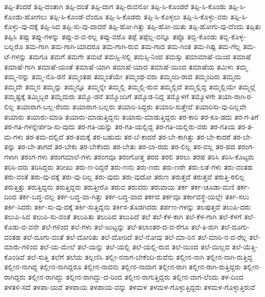 {ತಪ್ಪಿ-ತೆಂದರೆ
ತಪ್ಪಿ-ದಂತಾಗಿ
ತಪ್ಪಿ-ದಂತೆ
ತಪ್ಪಿ-ದಾಗ
ತಪ್ಪಿ-ರುವನೋ
ತಪ್ಪಿ-ಸಿ-ಕೊಂಡರೆ
ತಪ್ಪಿ-ಸಿ-ಕೊಂಡು
ತಪ್ಪಿ-ಸಿ-ಕೊಂಡು-ಹೋಗಲು
ತಪ್ಪಿ-ಸಿ-ಕೊಂಡೆ-ವೆಂದೂ
ತಪ್ಪಿ-ಸಿ-ಕೊಡರು
ತಪ್ಪಿ-ಸಿ-ಕೊಳ್ಳಲು
ತಪ್ಪಿ-ಸಿ-ಕೊಳ್ಳು-ವರು
ತಪ್ಪಿ-ಸಿ-ಕೊಳ್ಳು-ವು-ದಕ್ಕೆ
ತಪ್ಪಿ-ಸಿದ
ತಪ್ಪಿ-ಸು-ವು-ದಾದರೆ
ತಪ್ಪಿ-ಹೋ-ಗಿತ್ತು
ತಪ್ಪಿ-ಹೋ-ಯಿತು
ತಪ್ಪಿ-ಹೋಗು-ವು-ದೆಂದು
ತಪ್ಪಿತು
ತಪ್ಪಿಸಿ
ತಪ್ಪು
ತಪ್ಪು-ಗಳನ್ನು
ತಪ್ಪು-ವ-ವ-ರಲ್ಲ
ತಪ್ಪು-ವರೊ
ತಪ್ಪೆ
ತಪ್ಪೆಲ್ಲ-ವನ್ನೂ
ತಪ್ಪೊ
ತಬ್ಬಿ-ಕೊಂಡು
ತಬ್ಬಿ-ಕೊಳ್ಳ-ಬಲ್ಲರೊ
ತಮ-ಗಾಗಿ
ತಮ-ಗಾಗಿ-ಯಾದರೂ
ತಮ-ಗಾಗಿ-ರುವ
ತಮ-ಗಾದ
ತಮ-ಗಿಂತ
ತಮ-ಗಿಷ್ಟ
ತಮ-ಗೆಲ್ಲ
ತಮ-ಟೆ-ಗಳನ್ನು
ತಮಗೂ
ತಮಗೆ
ತಮಗೇ
ತಮಟೆ
ತಮಸ್ಸಿ-ನಲ್ಲಿ
ತಮಸ್ಸಿ-ನಿಂದ
ತಮಸ್ಸು
ತಮಾಮಾಷೆ-ಯಿಂದ
ತಮಾಷೆ
ತಮಾಷೆ-ಗಾಗಿ
ತಮಾಷೆ-ಯಂತೆ
ತಮಾಷೆ-ಯಾಗಿ
ತಮಾಷೆ-ಯಾದ
ತಮಾಷೆ-ಯಿಂದ
ತಮಾಷೆಯ
ತಮಿಳು
ತಮ್ಮ
ತಮ್ಮ-ನನ್ನು
ತಮ್ಮ-ನೊ-ಡನೆ
ತಮ್ಮಂತಹ
ತಮ್ಮಂತೆಯೇ
ತಮ್ಮಂಥ-ವರು
ತಮ್ಮಂದಿ-ರಾದ
ತಮ್ಮಂದಿರು
ತಮ್ಮದು
ತಮ್ಮದೇ
ತಮ್ಮನ
ತಮ್ಮನ್ನು
ತಮ್ಮನ್ನೂ
ತಮ್ಮನ್ನೇ
ತಮ್ಮಲ್ಲಿ
ತಮ್ಮಲ್ಲಿ-ರುವ
ತಮ್ಮಲ್ಲಿದೆ
ತಮ್ಮಲ್ಲಿದ್ದ
ತಮ್ಮಲ್ಲಿಯೇ
ತಮ್ಮಲ್ಲೆ
ತಮ್ಮಷ್ಟಕ್ಕೆ
ತಮ್ಮಿಬ್ಬರ
ತಮ್ಮೆದುರು
ತಮ್ಮೊ-ಡನೆ
ತಮ್ಮೊಂದಿಗೆ
ತಮ್ಮೊಡ-ನಿದ್ದ
ತಮ್ಮೊಳಗೆ
ತಮ್ಮೊಳಗೇ
ತಯಾ-ರಾಗಿ-ರ-ಲಿಲ್ಲ
ತಯಾರಾಗ-ಬಲ್ಲ-ರೆಂದು
ತಯಾರಾಗ-ಬಲ್ಲರು
ತಯಾರಿ-ಸಿದ್ದರು
ತಯಾರಿ-ಸುತ್ತೇವೆ
ತಯಾರಿಸು-ವು-ದಿಲ್ಲವೇ
ತಯಾರು
ತಯಾರು-ಮಾಡಿ
ತಯಾರು-ಮಾಡುತ್ತಿದ್ದನು
ತಯಾರು-ಮಾಡುತ್ತಿದ್ದರು
ತರ-ಕಾರಿ
ತರ-ಕೂ-ಡದು
ತರ-ಗ-ತಿಗೆ
ತರ-ಗತಿ-ಗಳನ್ನೇರ್ಪಡಿ-ಸು-ವುದು
ತರ-ಗತಿ-ಯನ್ನು
ತರ-ಗತಿ-ಯಲ್ಲಿದ್ದ
ತರ-ಗತಿ-ಯಲ್ಲಿರು-ವರು
ತರ-ಗತಿಯ
ತರ-ತ-ಮ-ಗಳು
ತರ-ತಮ-ದಲ್ಲಿದೆ
ತರ-ತಮಕ್ಕೆ
ತರ-ಬಹುದು
ತರ-ಬೆ-ಕಾದರೆ
ತರ-ಬೇ-ಕಾಗಿತ್ತು
ತರ-ಬೇ-ಕಾದರೆ
ತರ-ಬೇ-ತನ್ನು
ತರ-ಬೇ-ತಾಗದೆ
ತರ-ಬೇಕು
ತರ-ಬೇಕೆಂದು
ತರ-ಬೇತು
ತರ-ಲಾ-ರದು
ತರ-ಲಿಲ್ಲ
ತರ-ವಲ್ಲ
ತರ-ಹದ
ತರಂಗ-ಗಳಾಗಿ
ತರಂಗ-ಗಳು
ತರಂಗಮಾಲೆ-ಗಳು
ತರಂಗವೂ
ತರಂಗೋತ್ತ
ತರದ
ತರಲಿ
ತರಲು
ತರಹ
ತರಿಸಿ
ತರಿಸಿ-ಕೊಟ್ಟರು
ತರಿಸಿ-ದರು
ತರಿಸಿದ್ದರು
ತರೀಖು
ತರು-ಣ-ರಿದ್ದರೆ
ತರು-ಣನು
ತರು-ಣರು
ತರು-ಣರೇ
ತರು-ಲತೆ-ಗಳು
ತರು-ವಂತಹ
ತರು-ವಂತೆ
ತರು-ವು-ದಕ್ಕೆ
ತರು-ವು-ದಿಲ್ಲ
ತರು-ವುದು
ತರು-ವುದೋ
ತರುಣ
ತರುತ್ತದೆ
ತರುತ್ತವೆ
ತರುತ್ತಿ-ರಲಿಲ್ಲ
ತರುತ್ತಿತ್ತು
ತರುತ್ತಿದ್ದನು
ತರುತ್ತಿದ್ದರು
ತರುತ್ತೀರೊ
ತರುವ
ತರುವರು
ತರುವಾಯ
ತರ್ಕ
ತರ್ಕ-ಚೂಡಾ-ಮಣಿ
ತರ್ಕ-ದಿಂದ
ತರ್ಕ-ಬದ್ಧ-ವಲ್ಲ
ತರ್ಕ-ಬದ್ಧ-ವಾ-ಗಿತ್ತು
ತರ್ಕ-ಬದ್ಧ-ವಾದ
ತರ್ಕದ
ತರ್ಕವೂ
ತರ್ಕಾವಸ್ಥೆ-ಯಲ್ಲೇ
ತರ್ಕಿ-ಸಲು
ತರ್ಕಿ-ಸಿದರು
ತರ್ಕಿ-ಸು-ವು-ದಕ್ಕೆ
ತರ್ಕಿ-ಸುತ್ತಿದ್ದನು
ತರ್ಕಿಸ-ತೊಡಗಿದರು
ತರ್ಪಣ-ಗಳನ್ನು
ತಲಪುತ್ತದೆ
ತಲುಪಿ-ದರು
ತಲುಪಿ-ಸಿದ
ತಲುಪಿ-ಸು-ವಂತೆ
ತಲುಪಿತು
ತಲುಪಿದ
ತಲುಪಿದೆ
ತಲೆ
ತಲೆ-ಕೆಳ-ಕಾಗಿ
ತಲೆ-ಕೆಳ-ಗಾಗಿ
ತಲೆ-ಕೆಳಗೆ
ತಲೆ-ಕೊಡು-ವ-ವನೇ
ತಲೆ-ಗಳಿಂದ
ತಲೆ-ಗಳು
ತಲೆ-ಜುಟ್ಟನ್ನು
ತಲೆ-ತಲಾಂತರ-ದ-ವ-ರೆಗೂ
ತಲೆ-ತಿ-ರುಗಿ
ತಲೆ-ದೂಗು-ವಂತಹ
ತಲೆ-ದೂಗು-ವಂತೆ
ತಲೆ-ದೋರಿತು
ತಲೆ-ದೋರಿದೆ
ತಲೆ-ನೋವು
ತಲೆ-ಮಾ-ರಿನ
ತಲೆ-ಮಾರಿ-ನ-ವ-ರೆಲ್ಲ
ತಲೆ-ಮಾರು-ಗಳಿಂದ
ತಲೆ-ಯ-ಮೇಲೆ
ತಲೆ-ಯನ್ನು
ತಲೆ-ಯಲ್ಲಿ
ತಲೆ-ಯಲ್ಲಿ-ರುವ
ತಲೆ-ಯಿಂದ
ತಲೆ-ಯಿಲ್ಲದ
ತಲೆ-ಯೆತ್ತಿ-ಕೊಂಡಿವೆ
ತಲೆ-ಸುತ್ತಿ
ತಲೆಗೆ
ತಲೆಯ
ತಲ್ಲಣಿಸಿ
ತಲ್ಲೀ-ನನಾಗ-ಬೇಕೆಂದಿ-ರುವೆನು
ತಲ್ಲೀನ-ನಾಗಿ
ತಲ್ಲೀನ-ನಾಗಿ-ರುತ್ತಿದ್ದ
ತಲ್ಲೀನ-ನಾಗಿದ್ದ
ತಲ್ಲೀನ-ನಾಗಿದ್ದರೂ
ತಲ್ಲೀನ-ನಾದನು
ತಲ್ಲೀನ-ನಾದಾಗ
ತಲ್ಲೀನ-ರಾಗಿ
ತಲ್ಲೀನ-ರಾಗಿ-ರುತ್ತಿದ್ದರು
ತಲ್ಲೀನ-ರಾಗಿದ್ದರು
ತಲ್ಲೀನ-ರಾಗಿದ್ದು
ತಲ್ಲೀನ-ರಾಗಿದ್ದು-ದ-ರಿಂದ
ತಲ್ಲೀನ-ರಾಗುತ್ತಿದ್ದರು
ತಲ್ಲೀನ-ವಾಗ-ಲೆಂದು
ತಳ-ದಿಂದ
ತಳತಳಿ-ಸದೆ
ತಳಪಾ-ಯವೆ
ತಳಪಾಯ
ತಳಪಾಯ-ವನ್ನು
ತಳಮಳ
ತಳಮಳ-ಗೊಳ್ಳುತ್ತಿದ್ದರು
ತಳಮಳ-ಗೊಳ್ಳುತ್ತಿರುವೆ
}
